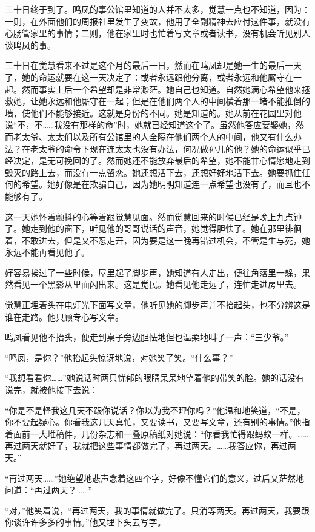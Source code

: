 \par 三十日终于到了。鸣凤的事公馆里知道的人并不太多，觉慧一点也不知道，因为：一则，在外面他们的周报社里发生了变故，他用了全副精神去应付这件事，就没有心肠管家里的事情；二则，他在家里时也忙着写文章或者读书，没有机会听见别人谈鸣凤的事。
\par 三十日在觉慧看来不过是这个月的最后一日，然而在鸣凤却是她一生的最后一天了，她的命运就要在这一天决定了：或者永远跟他分离，或者永远和他厮守在一起。然而事实上后一个希望却是非常渺茫。她自己也知道。自然她满心希望他来拯救她，让她永远和他厮守在一起；但是在他们两个人的中间横着那一堵不能推倒的墙，使他们不能够接近。这就是身份的不同。她是知道的。她从前在花园里对他说“不，不……我没有那样的命”时，她就已经知道这个了。虽然他答应要娶她，然而老太爷、太太们以及所有公馆里的人全隔在他们两个人的中间，他又有什么办法？在老太爷的命令下现在连太太也没有办法，何况做孙儿的他？她的命运似乎已经决定，是无可挽回的了。然而她还不能放弃最后的希望，她不能甘心情愿地走到毁灭的路上去，而没有一点留恋。她还想活下去，还想好好地活下去。她要抓住任何的希望。她好像是在欺骗自己，因为她明明知道连一点希望也没有了，而且也不能够有了。
\par 这一天她怀着颤抖的心等着跟觉慧见面。然而觉慧回来的时候已经是晚上九点钟了。她走到他的窗下，听见他的哥哥说话的声音，她觉得胆怯了。她在那里徘徊着，不敢进去，但是又不忍走开，因为要是这一晚再错过机会，不管是生与死，她永远不能再看见他了。
\par 好容易挨过了一些时候，屋里起了脚步声，她知道有人走出，便往角落里一躲，果然看见一个黑影从里面闪出来。这是觉民。她看见他走远了，连忙走进房里去。
\par 觉慧正埋着头在电灯光下面写文章，他听见她的脚步声并不抬起头，也不分辨这是谁在走路。他只顾专心写文章。
\par 鸣凤看见他不抬头，便走到桌子旁边胆怯地但也温柔地叫了一声：“三少爷。”
\par “鸣凤，是你？”他抬起头惊讶地说，对她笑了笑。“什么事？”
\par “我想看看你……”她说话时两只忧郁的眼睛呆呆地望着他的带笑的脸。她的话没有说完，就被他接下去说：
\par “你是不是怪我这几天不跟你说话？你以为我不理你吗？”他温和地笑道，“不是，你不要起疑心。你看我这几天真忙，又要读书，又要写文章，还有别的事情。”他指着面前一大堆稿件，几份杂志和一叠原稿纸对她说：“你看我忙得跟蚂蚁一样。……再过两天就好了，我就把这些事情都做完了，再过两天。……我答应你，再过两天。”
\par “再过两天……”她绝望地悲声念着这四个字，好像不懂它们的意义，过后又茫然地问道：“再过两天？……”
\par “对，”他笑着说，“再过两天，我的事情就做完了。只消等两天。再过两天，我要跟你谈许许多多的事情。”他又埋下头去写字。
